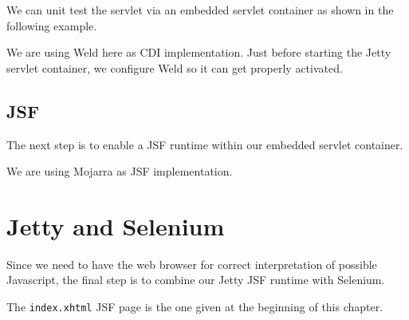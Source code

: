 We can unit test the servlet via an embedded servlet container as shown in the following example.

We are using Weld \cite{weld} here as CDI implementation.
Just before starting the Jetty servlet container, we configure Weld so it can get properly activated.

\subsection{JSF}

The next step is to enable a JSF runtime within our embedded servlet container.

We are using Mojarra \cite{mojarra} as JSF implementation.

\section{Jetty and Selenium}
Since we need to have the web browser for correct interpretation of possible Javascript, the final step is to combine our Jetty JSF runtime with Selenium.

The \texttt{index.xhtml} JSF page is the one given at the beginning of this chapter.
